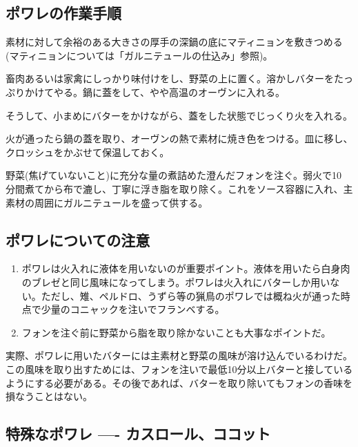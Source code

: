 \hypertarget{ux30ddux30efux30ecux306eux4f5cux696dux624bux9806}{%
\subsection{ポワレの作業手順}\label{ux30ddux30efux30ecux306eux4f5cux696dux624bux9806}}

素材に対して余裕のある大きさの厚手の深鍋の底にマティニョンを敷きつめる
(マティニョンについては「ガルニテュールの仕込み」参照)。

畜肉あるいは家禽にしっかり味付けをし、野菜の上に置く。溶かしバターをたっぷりかけてやる。鍋に蓋をして、やや高温のオーヴンに入れる。

そうして、小まめにバターをかけながら、蓋をした状態でじっくり火を入れる。

火が通ったら鍋の蓋を取り、オーヴンの熱で素材に焼き色をつける。皿に移し、クロッシュをかぶせて保温しておく。

野菜(焦げていないこと)に充分な量の煮詰めた澄んだフォンを注ぐ。弱火で10
分間煮てから布で漉し、丁寧に浮き脂を取り除く。これをソース容器に入れ、主素材の周囲にガルニテュールを盛って供する。

\hypertarget{ux30ddux30efux30ecux306bux3064ux3044ux3066ux306eux6ce8ux610f}{%
\subsection{ポワレについての注意}\label{ux30ddux30efux30ecux306bux3064ux3044ux3066ux306eux6ce8ux610f}}

\begin{enumerate}
\def\labelenumi{\arabic{enumi}.}
\item
  ポワレは火入れに液体を用いないのが重要ポイント。液体を用いたら白身肉のブレゼと同じ風味になってしまう。ポワレは火入れにバターしか用いない。ただし、雉、ペルドロ、うずら等の猟鳥のポワレでは概ね火が通った時点で少量のコニャックを注いでフランベする。
\item
  フォンを注ぐ前に野菜から脂を取り除かないことも大事なポイントだ。
\end{enumerate}

実際、ポワレに用いたバターには主素材と野菜の風味が溶け込んでいるわけだ。この風味を取り出すためには、フォンを注いで最低10分以上バターと接しているようにする必要がある。その後であれば、バターを取り除いてもフォンの香味を損なうことはない。

\hypertarget{ux7279ux6b8aux306aux30ddux30efux30ec-ux30abux30b9ux30edux30fcux30ebux30b3ux30b3ux30c3ux30c8}{%
\subsection{特殊なポワレ ----
カスロール、ココット}\label{ux7279ux6b8aux306aux30ddux30efux30ec-ux30abux30b9ux30edux30fcux30ebux30b3ux30b3ux30c3ux30c8}}


